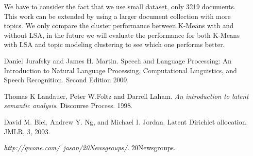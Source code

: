 \documentclass[12pt]{article}
\begin{document}
We have to consider the fact that we use small dataset, only 3219 documents. This work can be extended by using a larger document collection with more topics. We only compare the cluster performance between K-Means with and without LSA, in the future we will evaluate the performance for both K-Means with LSA and topic modeling clustering to see which one performs better.



\begin{thebibliography}{9}

Daniel Jurafsky and James H. Martin. Speech and Language Processing: An
Introduction to Natural Language Processing, Computational Linguistics,
and Speech Recognition. Second Edition 2009.

Thomas K Landauer, Peter W.Foltz and Darrell Laham. 
\textit{An introduction to latent semantic analysis}. Discourse Process. 1998.

David M. Blei, Andrew Y. Ng, and Michael I. Jordan. Latent Dirichlet allocation. JMLR, 3, 2003.

\textit{http://qwone.com/~jason/20Newsgroups/}. 20Newsgroups.



\end{thebibliography}
\end{document}
